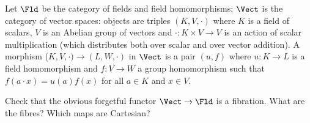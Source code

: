 \begin{exercise}
Let \(\Fld\) be the category of fields and field homomorphisms; \(\Vect\) is the category of vector spaces: objects are triples \((K, V, \cdot)\) where \(K\) is a field of scalars, \(V\) is an Abelian group of vectors and \(\cdot : K \times V \to V\) is an action of scalar multiplication (which distributes both over scalar and over vector addition).
A morphism (\(K, V, \cdot) \to (L, W, \cdot)\) in \(\Vect\) is a pair \((u, f)\) where \(u : K \to L\) is a field homomorphism and \(f : V \to W\) a group homomorphism such that \(f(a \cdot x) = u(a) f(x)\) for all \(a \in K\) and \(x \in V\).

Check that the obvious forgetful functor \(\Vect \to \Fld\) is a fibration.
What are the fibres?
Which maps are Cartesian?
\end{exercise}